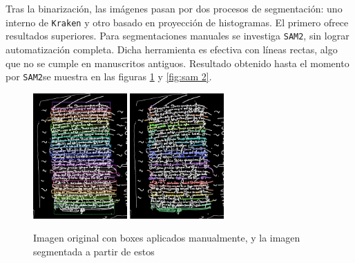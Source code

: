 \documentclass[11pt,a4paper]{article}
\begin{document}
Tras la binarización, las imágenes pasan por dos procesos de segmentación: uno interno de \texttt{Kraken} y otro basado en proyección de histogramas. El primero ofrece resultados superiores. Para segmentaciones manuales se investiga \texttt{SAM2}, sin lograr automatización completa. Dicha herramienta es efectiva con líneas rectas, algo que no se cumple en manuscritos antiguos. Resultado obtenido hasta el momento por \texttt{SAM2}se muestra en las figuras \ref{fig:sam2} y \ref{fig:sam 2}.

\begin{figure}[h] 
\centering 
\begin{minipage}{1.0\textwidth} 
\includegraphics[width=0.32\textwidth]{source_image.png} 
\includegraphics[width=0.32\textwidth]{segmented_image.png} 
\caption{Imagen original con boxes aplicados manualmente, y la imagen segmentada a partir de estos} 
\label{fig:sam2} 
\end{minipage} 
\end{figure}
\end{document}
